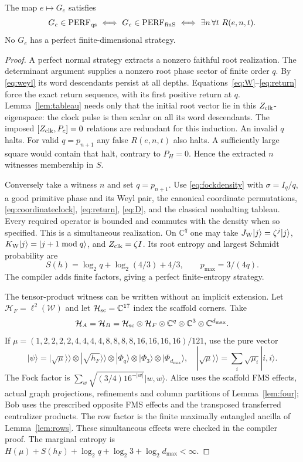 \begin{theorem}\label{thm:reduction}
The map $e\mapsto G_e$ satisfies
\[
 G_e\in\perf_{\qs}\ \Longleftrightarrow\
 G_e\in\perf_{\finS}\ \Longleftrightarrow\
 \exists n\,\forall t\ R(e,n,t).
\]
No $G_e$ has a perfect finite-dimensional strategy.
\end{theorem}
\begin{proof}
A perfect normal strategy extracts a nonzero faithful root realization. The determinant argument supplies a nonzero root phase sector of finite order $q$. By \eqref{eq:weyl} its word descendants persist at all depths. Equations~\eqref{eq:W}--\eqref{eq:return} force the exact return sequence, with its first positive return at $q$. Lemma~\ref{lem:tableau} needs only that the initial root vector lie in this $Z_{\rm clk}$-eigenspace: the clock pulse is then scalar on all its word descendants. The imposed $[Z_{\rm clk},P_c]=0$ relations are redundant for this induction. An invalid $q$ halts. For valid $q=p_{n+1}$ any false $R(e,n,t)$ also halts. A sufficiently large square would contain that halt, contrary to $P_H=0$. Hence the extracted $n$ witnesses membership in $S$.

Conversely take a witness $n$ and set $q=p_{n+1}$. Use \eqref{eq:fockdensity} with $\sigma=I_q/q$, a good primitive phase and its Weyl pair, the canonical coordinate permutations, \eqref{eq:coordinateclock}, \eqref{eq:return}, \eqref{eq:D}, and the classical nonhalting tableau. Every required operator is bounded and commutes with the density when so specified. This is a simultaneous realization. On $\mathbb C^q$ one may take $J_{\rm W}|j\rangle=\zeta^j|j\rangle$, $K_{\rm W}|j\rangle=|j+1\bmod q\rangle$, and $Z_{\rm clk}=\zeta I$. Its root entropy and largest Schmidt probability are
\begin{equation}\label{eq:witnessentropy}
 S(h)=\log_2q+\log_2(4/3)+4/3,\qquad p_{\max}=3/(4q).
\end{equation}
The compiler adds finite factors, giving a perfect finite-entropy strategy.

The tensor-product witness can be written without an implicit extension.
Let $\mathcal H_F=\ell^2(\mathcal W)$ and let $\mathcal H_{\rm sc}=\mathbb C^{17}$
index the scaffold corners. Take
\[
 \mathcal H_A=\mathcal H_B=
 \mathcal H_{\rm sc}\otimes\mathcal H_F\otimes\mathbb C^q
 \otimes\mathbb C^3\otimes\mathbb C^{d_{\max}}.
\]
If $\mu=(1,2,2,2,2,4,4,4,4,8,8,8,8,16,16,16,16)/121$,
use the pure vector
\[
 |\psi\rangle=|\sqrt\mu\rangle\!\rangle\otimes
 |\sqrt{h_F}\rangle\!\rangle\otimes|\Phi_q\rangle
 \otimes|\Phi_3\rangle\otimes|\Phi_{d_{\max}}\rangle,
 \quad |\sqrt\mu\rangle\!\rangle=\sum_i\sqrt{\mu_i}|i,i\rangle.
\]
The Fock factor is $\sum_w\sqrt{(3/4)16^{-|w|}}|w,w\rangle$.
Alice uses the scaffold FMS effects, actual graph projections, refinements
and column partitions of Lemma~\ref{lem:four}; Bob uses the prescribed
opposite FMS effects and the transposed transferred centralizer products.
The row factor is the finite maximally entangled ancilla of
Lemma~\ref{lem:rows}. These simultaneous effects were checked in the
compiler proof. The marginal entropy is
$H(\mu)+S(h_F)+\log_2q+\log_2 3+\log_2d_{\max}<\infty$.


\end{proof}
